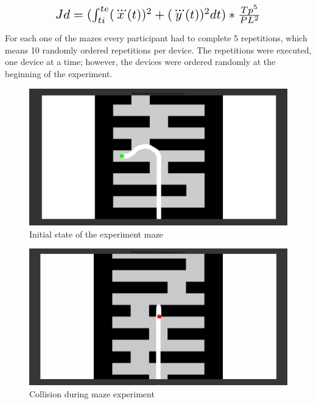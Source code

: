 \begin{equation}
   \scalebox{1.5}{$Jd=(\int_{ti}^{te}(\dddot{x}(t))^2 + (\dddot{y}(t))^2 dt)*\frac{Tp^5}{PL^2}$}
   \centering
   \label{eq:dsjeq}
\end{equation}

For each one of the mazes every participant had to complete 5 repetitions, which means 10 randomly ordered repetitions per device. The repetitions were executed, one device at a time; however, the devices were ordered randomly at the beginning of the experiment.\\

\begin{figure}[ht]
   \centering
   \includegraphics[width=1.0\textwidth]{img/maze/maze.png}
   \caption{Initial state of the experiment maze}
   \label{img:maze}
\end{figure}

\begin{figure}[ht]
   \centering
   \includegraphics[width=1.0\textwidth]{img/maze/mazeColl.png}
   \caption{Collision during maze experiment}
   \label{img:mazeColl}
\end{figure}

